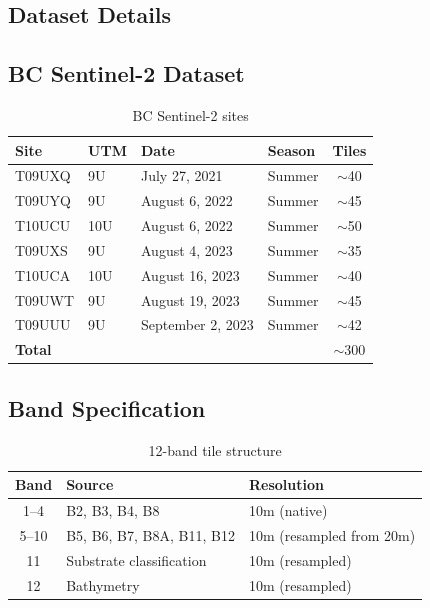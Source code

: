 \documentclass[11pt,a4paper]{article}
\begin{document}
\begin{itemize}
\section{Dataset Details}
\label{app:datasets}

\subsection{BC Sentinel-2 Dataset}

\begin{table}[h]
\centering
\caption{BC Sentinel-2 sites}
\begin{tabular}{llllc}
\toprule
\textbf{Site} & \textbf{UTM} & \textbf{Date} & \textbf{Season} & \textbf{Tiles} \\
\midrule
T09UXQ & 9U & July 27, 2021 & Summer & $\sim$40 \\
T09UYQ & 9U & August 6, 2022 & Summer & $\sim$45 \\
T10UCU & 10U & August 6, 2022 & Summer & $\sim$50 \\
T09UXS & 9U & August 4, 2023 & Summer & $\sim$35 \\
T10UCA & 10U & August 16, 2023 & Summer & $\sim$40 \\
T09UWT & 9U & August 19, 2023 & Summer & $\sim$45 \\
T09UUU & 9U & September 2, 2023 & Summer & $\sim$42 \\
\midrule
\multicolumn{4}{l}{\textbf{Total}} & $\sim$300 \\
\bottomrule
\end{tabular}
\end{table}

\subsection{Band Specification}

\begin{table}[h]
\centering
\caption{12-band tile structure}
\begin{tabular}{cll}
\toprule
\textbf{Band} & \textbf{Source} & \textbf{Resolution} \\
\midrule
1--4 & B2, B3, B4, B8 & 10m (native) \\
5--10 & B5, B6, B7, B8A, B11, B12 & 10m (resampled from 20m) \\
11 & Substrate classification & 10m (resampled) \\
12 & Bathymetry & 10m (resampled) \\
\bottomrule
\end{tabular}
\end{table}



\end{itemize}
\end{document}

